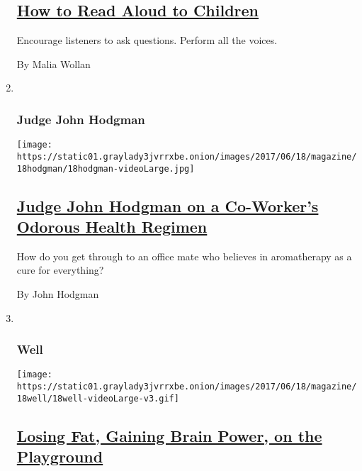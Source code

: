 \begin{enumerate}
{  \subsection{\texorpdfstring{\href{/2017/06/16/magazine/how-to-read-aloud-to-children.html}{How
  to Read Aloud to
  Children}}{How to Read Aloud to Children}}\label{how-to-read-aloud-to-children}}

  Encourage listeners to ask questions. Perform all the voices.

  By Malia Wollan
\item ~
  \hypertarget{judge-john-hodgman}{%
  \subsubsection{Judge John Hodgman}\label{judge-john-hodgman}}

  \texttt{[image: https://static01.graylady3jvrrxbe.onion/images/2017/06/18/magazine/18hodgman/18hodgman-videoLarge.jpg]}

  \hypertarget{judge-john-hodgman-on-a-co-workers-odorous-health-regimen}{%
  \subsection{\texorpdfstring{\href{/2017/06/16/magazine/judge-john-hodgman-on-a-co-workers-odorous-health-regimen.html}{Judge
  John Hodgman on a Co-Worker's Odorous Health
  Regimen}}{Judge John Hodgman on a Co-Worker's Odorous Health Regimen}}\label{judge-john-hodgman-on-a-co-workers-odorous-health-regimen}}

  How do you get through to an office mate who believes in aromatherapy
  as a cure for everything?

  By John Hodgman
\item ~
  \hypertarget{well}{%
  \subsubsection{Well}\label{well}}

  \texttt{[image: https://static01.graylady3jvrrxbe.onion/images/2017/06/18/magazine/18well/18well-videoLarge-v3.gif]}

  \hypertarget{losing-fat-gaining-brain-power-on-the-playground}{%
  \subsection{\texorpdfstring{\href{/2017/06/16/magazine/losing-fat-gaining-brain-power-on-the-playground.html}{Losing
  Fat, Gaining Brain Power, on the
  Playground}}{Losing Fat, Gaining Brain Power, on the Playground}}\label{losing-fat-gaining-brain-power-on-the-playground}}


\end{enumerate}
